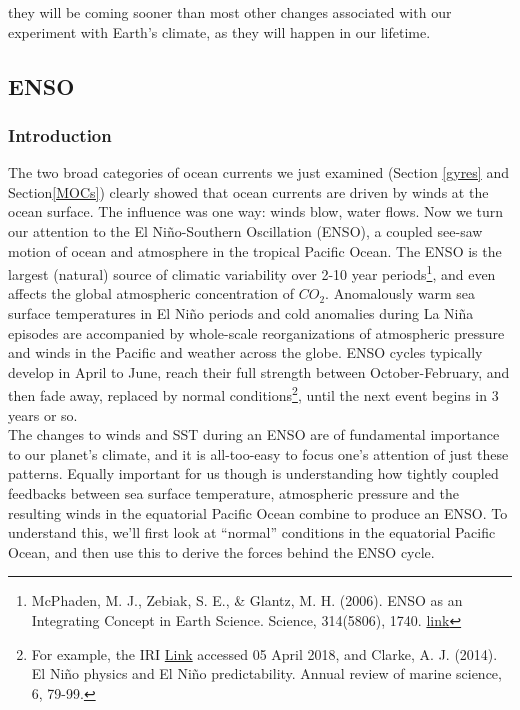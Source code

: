 {they will be coming sooner than most other changes associated with our experiment with Earth's climate, as they will happen in our lifetime. 
\subsection{ENSO}\label{ENSO}
\subsubsection{Introduction}
The two broad categories of ocean currents we just examined (Section \ref{gyres} and Section\ref{MOCs}) clearly showed that ocean currents are driven by winds at the ocean surface. The influence was one way: winds blow, water flows. Now we turn our attention to the El Ni\~no-Southern Oscillation (ENSO), a coupled see-saw motion of ocean and atmosphere in the tropical Pacific Ocean. The ENSO is the largest (natural) source of climatic variability over 2-10 year periods\footnote{McPhaden, M. J., Zebiak, S. E., \& Glantz, M. H. (2006). ENSO as an Integrating Concept in Earth Science. Science, 314(5806), 1740. \href{https://doi.org/10.1126/science.1132588}{link}}, and even affects the global atmospheric concentration of $CO_2$. Anomalously warm sea surface temperatures in El Ni\~no periods and cold anomalies during La Ni\~na episodes are accompanied by whole-scale reorganizations of atmospheric pressure and winds in the Pacific and weather across the globe. ENSO cycles typically develop in April to June, reach their full strength between October-February, and then fade away, replaced by normal conditions\footnote{For example, the IRI \href{http://iri.columbia.edu/our-expertise/climate/forecasts/enso/current/}{Link} accessed 05 April 2018, and Clarke, A. J. (2014). El Ni\~no physics and El Ni\~no predictability. Annual review of marine science, 6, 79-99.}, until the next event begins in 3 years or so.\\
The changes to winds and SST during an ENSO are of fundamental importance to  our planet's climate, and it is all-too-easy to focus one's attention of just these patterns. Equally important for us though is understanding how tightly coupled feedbacks between sea surface temperature, atmospheric pressure and the resulting winds in the equatorial Pacific Ocean combine to produce an ENSO. To understand this, we'll first look at ``normal'' conditions in the equatorial Pacific Ocean, and then use this to derive the forces behind the ENSO cycle.

}
